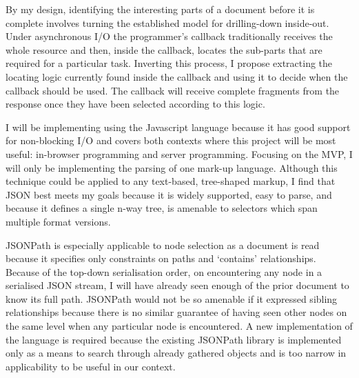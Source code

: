 \documentclass[]{article}
\begin{document}
By my design, identifying the interesting parts of a document before it
is complete involves turning the established model for drilling-down
inside-out. Under asynchronous I/O the programmer's callback
traditionally receives the whole resource and then, inside the callback,
locates the sub-parts that are required for a particular task. Inverting
this process, I propose extracting the locating logic currently found
inside the callback and using it to decide when the callback should be
used. The callback will receive complete fragments from the response
once they have been selected according to this logic.

I will be implementing using the Javascript language because it has good
support for non-blocking I/O and covers both contexts where this project
will be most useful: in-browser programming and server programming.
Focusing on the MVP, I will only be implementing the parsing of one
mark-up language. Although this technique could be applied to any
text-based, tree-shaped markup, I find that JSON best meets my goals
because it is widely supported, easy to parse, and because it defines a
single n-way tree, is amenable to selectors which span multiple format
versions.

JSONPath is especially applicable to node selection as a document is
read because it specifies only constraints on paths and `contains'
relationships. Because of the top-down serialisation order, on
encountering any node in a serialised JSON stream, I will have already
seen enough of the prior document to know its full path. JSONPath would
not be so amenable if it expressed sibling relationships because there
is no similar guarantee of having seen other nodes on the same level
when any particular node is encountered. A new implementation of the
language is required because the existing JSONPath library is
implemented only as a means to search through already gathered objects
and is too narrow in applicability to be useful in our context.
\end{document}
